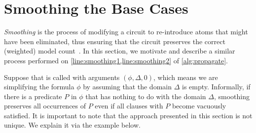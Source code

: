 \documentclass[letterpaper]{article} %
\theoremstyle{remark}
\theoremstyle{definition}
\begin{document}
\section{Smoothing the Base Cases}\label{sec:smoothing}

\emph{Smoothing} is the process of modifying a circuit to re-introduce atoms
that might have been eliminated, thus ensuring that the circuit preserves the
correct (weighted) model
count~\cite{darwiche2001tractable,DBLP:conf/ijcai/BroeckTMDR11}. In this
section, we motivate and describe a similar process performed on
\cref{line:smoothing1,line:smoothing2} of \cref{alg:propagate}.



Suppose that \Propagate is called with arguments $(\phi, \Delta, 0)$, which
means we are simplifying the formula $\phi$ by assuming that the domain $\Delta$
is empty. Informally, if there is a predicate $P$ in $\phi$ that has nothing to
do with the domain $\Delta$, smoothing preserves all occurrences of $P$ even if
all clauses with $P$ become vacuously satisfied. It is important to note that
the approach presented in this section is not unique. We explain it via the
example below.
\end{document}
